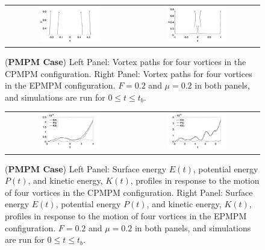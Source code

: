 \documentclass[a4paper,11pt]{article}
\begin{document}
%
\begin{figure}[!h]
\centering
\begin{tabular}{cc}
\includegraphics[width=0.5\textwidth]{tracks_F_pt2_tf_4_pmpm} & 
\includegraphics[width=0.5\textwidth]{tracks_F_pt2_tf_9_pmpm_sym}
\end{tabular}
\caption{\small  ({\bf PMPM Case}) Left Panel: Vortex paths for four vortices in the CPMPM configuration.  Right Panel: Vortex paths for four vortices in the EPMPM configuration. $F=0.2$ and $\mu=0.2$ in both panels, and simulations are run for $0\leq t \leq t_{b}$.}
\label{fig:trackpmpm}
\end{figure}

\begin{figure}[!h]
\centering
\begin{tabular}{cc}
\includegraphics[width=0.5\textwidth]{energy_profile_mu_pt2_F_pt2_pmpm} &
\includegraphics[width=0.5\textwidth]{energy_profile_mu_pt2_F_pt2_pmpm_sym}
\end{tabular}
\caption{\small ({\bf PMPM Case}) Left Panel: Surface energy $E(t)$, potential energy $P(t)$, and kinetic energy, $K(t)$, profiles in response to the motion of four vortices in the CPMPM configuration. Right Panel: Surface energy $E(t)$, potential energy $P(t)$, and kinetic energy, $K(t)$, profiles in response to the motion of four vortices in the EPMPM configuration.  $F=0.2$ and $\mu=0.2$ in both panels, and simulations are run for $0\leq t \leq t_{b}$.}
\label{fig:eprof_pmpm}
\end{figure}
\end{document}
